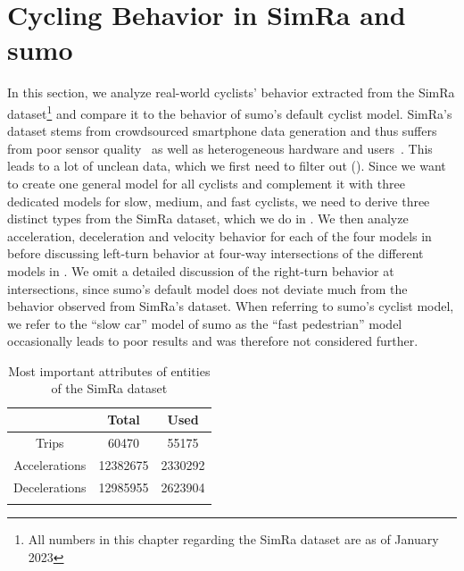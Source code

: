 \section{Cycling Behavior in SimRa and \ac{sumo}}
\label{sec:cycling_behavior_in_simra_and_sumo}
In this section, we analyze real-world cyclists' behavior extracted from the SimRa dataset\footnote{All numbers in this chapter regarding the SimRa dataset are as of January 2023} and compare it to the behavior of \ac{sumo}'s default cyclist model.
SimRa's dataset stems from crowdsourced smartphone data generation and thus suffers from poor sensor quality~\cite{chowdhury2014estimating, usami2018bicycle} as well as heterogeneous hardware and users~\cite{basiri2018impact}.
This leads to a lot of unclean data, which we first need to filter out ().
Since we want to create one general model for all cyclists and complement it with three dedicated models for slow, medium, and fast cyclists, we need to derive three distinct types from the SimRa dataset, which we do in .
We then analyze acceleration, deceleration and velocity behavior for each of the four models in  before discussing left-turn behavior at four-way intersections of the different models in .
We omit a detailed discussion of the right-turn behavior at intersections, since \ac{sumo}'s default model does not deviate much from the behavior observed from SimRa's dataset.
When referring to \ac{sumo}'s cyclist model, we refer to the ``slow car'' model of \ac{sumo} as the ``fast pedestrian'' model occasionally leads to poor results and was therefore not considered further.

\begin{table}
\centering
\caption{Most important attributes of entities of the SimRa dataset}%
\label{tab:dataset}
\begin{tabular}{ccc}
\toprule
& Total & Used \\
\midrule
\midrule
Trips & \num{60470} & \num{55175} \\
Accelerations & \num{12382675} & \num{2330292} \\
Decelerations & \num{12985955} & \num{2623904} \\
\bottomrule&
\end{tabular}
\end{table}

